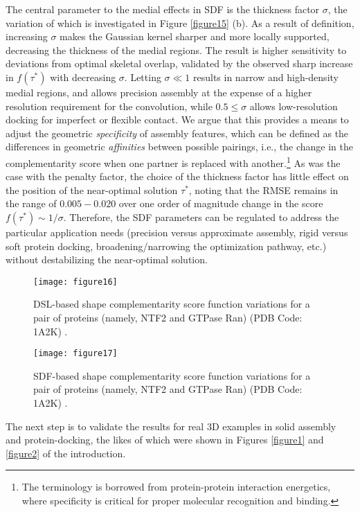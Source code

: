 \documentclass[article]{gmp2014}
\theoremstyle{definition}
\begin{document}
The central parameter to the medial effects in SDF is the thickness factor $\sigma$, the variation of which is investigated in Figure \ref{figure15} (b). As a result of definition, increasing $\sigma$ makes the Gaussian kernel sharper and more locally supported, decreasing the thickness of the medial regions. The result is higher sensitivity to deviations from optimal skeletal overlap, validated by the observed sharp increase in $f(\tau^\ast)$ with decreasing $\sigma$. Letting $\sigma \ll 1$ results in narrow and high-density medial regions, and allows precision assembly at the expense of a higher resolution requirement for the convolution, while $0.5 \leq \sigma$ allows low-resolution docking for imperfect or flexible contact. We argue that this provides a means to adjust the geometric {\it specificity} of assembly features, which can be defined as the differences in geometric {\it affinities} between possible pairings, i.e., the change in the complementarity score when one partner is replaced with another.\footnote{The terminology is borrowed from protein-protein interaction energetics, where specificity is critical for proper molecular recognition and binding.} As was the case with the penalty factor, the choice of the thickness factor has little effect on the position of the near-optimal solution $\tau^\ast$, noting that the RMSE remains in the range of $0.005-0.020$ over one order of magnitude change in the score $f(\tau^\ast) \sim 1/\sigma$. Therefore, the SDF parameters can be regulated to address the particular application needs (precision versus approximate assembly, rigid versus soft protein docking, broadening/narrowing the optimization pathway, etc.) without destabilizing the near-optimal solution.

%
\begin{figure}
    \centering
    \texttt{[image: figure16]}
    \caption{DSL-based shape complementarity score function variations for a pair of proteins (namely, NTF2 and GTPase Ran) (PDB Code: 1A2K) \cite{Stewart1998}.} \label{figure16}
\end{figure}
%

%
\begin{figure}
    \centering
    \texttt{[image: figure17]}
    \caption{SDF-based shape complementarity score function variations for a pair of proteins (namely, NTF2 and GTPase Ran) (PDB Code: 1A2K) \cite{Stewart1998}.} \label{figure17}
\end{figure}
%

The next step is to validate the results for real 3D examples in solid assembly and protein-docking, the likes of which were shown in Figures \ref{figure1} and \ref{figure2} of the introduction.
\end{document}
